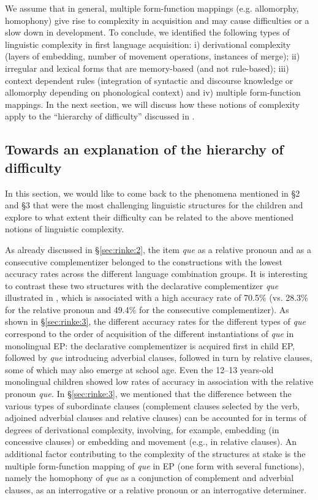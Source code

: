 \documentclass[output=paper]{langscibook}
\begin{document}
We assume that in general, multiple form-function mappings (e.g. allomorphy, homophony) give rise to complexity in acquisition and may cause difficulties or a slow down in development. To conclude, we identified the following types of linguistic complexity in first language acquisition: i) derivational complexity (layers of embedding, number of movement operations, instances of merge); ii) irregular and lexical forms that are memory-based (and not rule-based); iii) context dependent rules (integration of syntactic and discourse knowledge or allomorphy depending on phonological context) and iv) multiple form-function mappings. In the next section, we will discuss how these notions of complexity apply to the “hierarchy of difficulty” discussed in . 

\subsection{Towards an explanation of the hierarchy of difficulty}\label{sec:rinke:4.2}

In this section, we would like to come back to the phenomena mentioned in \S 2 and \S 3 that were the most challenging linguistic structures for the children and explore to what extent their difficulty can be related to the above mentioned notions of linguistic complexity.

As already discussed in \S \ref{sec:rinke:2}, the item \textit{que} as a relative pronoun and as a consecutive complementizer belonged to the constructions with the lowest accuracy rates across the different language combination groups. It is interesting to contrast these two structures with the declarative complementizer \textit{que} illustrated in , which is associated with a high accuracy rate of 70.5\% (vs. 28.3\% for the relative pronoun and 49.4\% for the consecutive complementizer). As shown in \S \ref{sec:rinke:3}, the different accuracy rates for the different types of \textit{que} correspond to the order of acquisition of the different instantiations of \textit{que} in monolingual EP: the declarative complementizer is acquired first in child EP, followed by \textit{que} introducing adverbial clauses, followed in turn by relative clauses, some of which may also emerge at school age. Even the 12–13 years-old monolingual children showed low rates of accuracy in association with the relative pronoun \textit{que.} In \S \ref{sec:rinke:3}, we mentioned that the difference between the various types of subordinate clauses (complement clauses selected by the verb, adjoined adverbial clauses and relative clauses) can be accounted for in terms of degrees of derivational complexity, involving, for example, embedding (in concessive clauses) or embedding and movement (e.g., in relative clauses). An additional factor contributing to the complexity of the structures at stake is the multiple form-function mapping of \textit{que} in EP (one form with several functions), namely the homophony of \textit{que} as a conjunction of complement and adverbial clauses, as an interrogative or a relative pronoun or an interrogative determiner.
\end{document}
